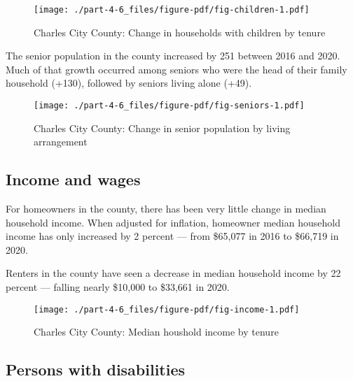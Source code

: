\documentclass[
  letterpaper,
  DIV=11,
  numbers=noendperiod]{scrreprt}
\begin{document}
\begin{figure}

{\centering \texttt{[image: ./part-4-6\_files/figure-pdf/fig-children-1.pdf]}

}

\caption{\label{fig-children}Charles City County: Change in households
with children by tenure}

\end{figure}

The senior population in the county increased by 251 between 2016 and
2020. Much of that growth occurred among seniors who were the head of
their family household (+130), followed by seniors living alone (+49).

\begin{figure}

{\centering \texttt{[image: ./part-4-6\_files/figure-pdf/fig-seniors-1.pdf]}

}

\caption{\label{fig-seniors}Charles City County: Change in senior
population by living arrangement}

\end{figure}

\hypertarget{income-and-wages-5}{%
\subsection{Income and wages}\label{income-and-wages-5}}

For homeowners in the county, there has been very little change in
median household income. When adjusted for inflation, homeowner median
household income has only increased by 2 percent --- from \$65,077 in
2016 to \$66,719 in 2020.

Renters in the county have seen a decrease in median household income by
22 percent --- falling nearly \$10,000 to \$33,661 in 2020.

\begin{figure}

{\centering \texttt{[image: ./part-4-6\_files/figure-pdf/fig-income-1.pdf]}

}

\caption{\label{fig-income}Charles City County: Median houshold income
by tenure}

\end{figure}

\hypertarget{persons-with-disabilities-4}{%
\subsection{Persons with
disabilities}\label{persons-with-disabilities-4}}
\end{document}
